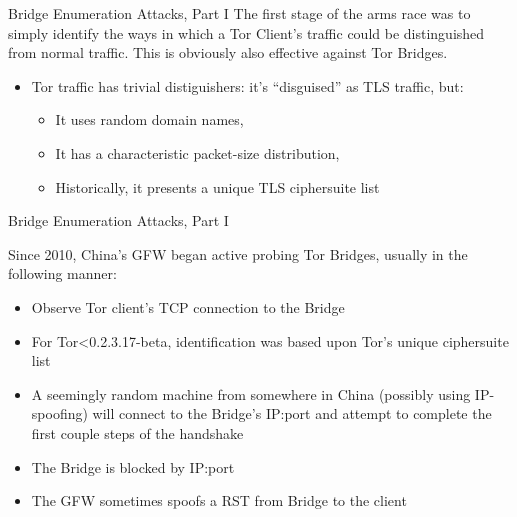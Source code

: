 \documentclass[9pt,a4paper,handout]{beamer}
\begin{document}
\begin{frame}{Bridge Enumeration Attacks, Part I}
  The first stage of the arms race was to simply identify the ways in which a Tor Client's traffic
  could be distinguished from normal traffic.  This is obviously also effective against
  Tor Bridges.

  \begin{itemize}
    \item<2-> Tor traffic has trivial distiguishers: it's ``disguised'' as TLS traffic, but:
      \begin{itemize}
        \item<3-> It uses random domain names,
        \item<4-> It has a characteristic packet-size distribution,
        \item<5-> Historically, it presents a unique TLS ciphersuite list
      \end{itemize}
  \end{itemize}

\end{frame}


\begin{frame}{Bridge Enumeration Attacks, Part I}
  \begin{block}{Since 2010, China's GFW began active probing Tor Bridges, usually in the following manner:}
    \begin{itemize}
    \item<2-> Observe Tor client's TCP connection to the Bridge
    \item<3-> For Tor<0.2.3.17-beta, identification was based upon Tor's unique ciphersuite list
    \item<4-> A seemingly random machine from somewhere in China (possibly using IP-spoofing) will
      connect to the Bridge's IP:port and attempt to complete the first couple steps of the
      handshake
    \item<5-> The Bridge is blocked by IP:port
    \item<6-> The GFW sometimes spoofs a RST from Bridge to the client
    \end{itemize}
  \end{block}

\end{frame}
\end{document}
